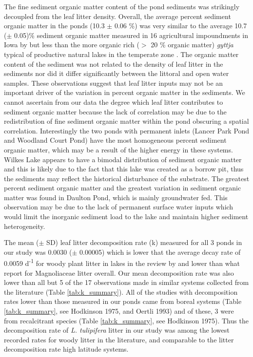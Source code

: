 \documentclass{article}
\begin{document}
The fine sediment organic matter content of the pond sediments was strikingly decoupled from the leaf litter density. Overall, the average percent sediment organic matter in the ponds (10.3 $\pm$ 0.06 \%) was very similar to the average 10.7 ($\pm$ 0.05)\% sediment organic matter measured in 16 agricultural impoundments in Iowa by \cite{Downing_2008} but less than the more organic rich ($>$ 20 \% organic matter) \emph{gyttja} typical of productive natural lakes in the temperate zone \cite{Dean_1998}. The organic matter content of the sediment was not related to the density of leaf litter in the sediments nor did it differ significantly between the littoral and open water samples. These observations suggest that leaf litter inputs may not be an important driver of the variation in percent organic matter in the sediments.  We cannot ascertain from our data the degree which leaf litter contributes to sediment organic matter because the lack of correlation may be due to the redistribution of fine sediment organic matter within the pond obscuring a spatial correlation. Interestingly the two ponds with permanent inlets (Lancer Park Pond and Woodland Court Pond) have the most homogeneous percent sediment organic matter, which may be a result of the higher energy in these systems. Wilkes Lake appears to have a bimodal distribution of sediment organic matter and this is likely due to the fact that this lake was created as a borrow pit, thus the sediments may reflect the historical disturbance of the substrate. The greatest percent sediment organic matter and the greatest variation in sediment organic matter was found in Daulton Pond, which is mainly groundwater fed. This observation may be due to the lack of permanent surface water inputs which would limit the inorganic sediment load to the lake and maintain higher sediment heterogeneity.

The mean ($\pm$ SD) leaf litter decomposition rate (k) measured for all 3 ponds in our study was 0.0030 ($\pm$ 0.00005) which is lower that the average decay rate of 0.0059 d\textsuperscript{-1} for woody plant litter in lakes in the review by \cite{Webster_1986} and lower than what \cite{Webster_1986} report for Magnoliaceae litter overall.  Our mean decomposition rate was also lower than all but 5 of the 17 observations made in similar systems collected from the literature (Table \ref{tab:k_summary}). All of the studies with decomposition rates lower than those measured in our ponds came from boreal systems (Table \ref{tab:k_summary}, see Hodkinson 1975, and Oertli 1993) and of these, 3 were from recalcitrant species (Table \ref{tab:k_summary}, see Hodkinson 1975). Thus the decomposition rate of \emph{L. tulipifera} litter in our study was among the lowest recorded rates for woody litter in the literature, and comparable to the litter decomposition rate high latitude systems. 
\end{document}
